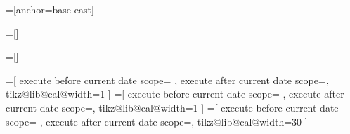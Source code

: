 
=[anchor=base east]

=[]

=[]

\def\tikzdaycode{\node[name=\pgfcalendarsuggestedname,every day]{\tikzdaytext};}
\def\tikzmonthcode{\node[every month]{\tikzmonthtext};}
\def\tikzyearcode{\node[every year]{\tikzyeartext};}

\def\tikzdaytext{\%d-}
\def\tikzmonthtext{\%mt}
\def\tikzyeartext{\%y0}




\def\tikz@lib@cal@width{1}

%
%

=[%
  execute before current date scope={
  },  
  execute after current date scope={\setlength{\pgf@y}{\tikz@lib@cal@yshift}\pgftransformyshift{-\pgf@y}},
  tikz@lib@cal@width=1
]
=[%
  execute before current date scope={
  },  
  execute after current date scope={\pgftransformyshift\tikz@lib@cal@yshift},
  tikz@lib@cal@width=1
]
=[%
  execute before current date scope={
  },  
  execute after current date scope={\pgftransformxshift\tikz@lib@cal@xshift},
  tikz@lib@cal@width=30%
]



